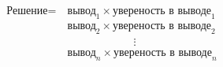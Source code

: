 \documentclass[preview]{standalone}
\begin{document}
\begin{align*}
\text{Решение}=\  &\text{вывод}_1 \times \text{увереность в выводе}_1\\ &\text{вывод}_2 \times \text{увереность в выводе}_2\\ &\qquad\qquad\qquad\vdots\\ &\text{вывод}_n \times \text{увереность в выводе}_n\\
\end{align*}
\end{document}
